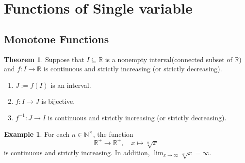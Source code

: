 \documentclass[12pt,a4paper]{book}
\newcommand{\bb}[1]{\mathbb{#1}}
\newenvironment{enu}{\begin{enumerate}[(1)]}{\end{enumerate}}
\theoremstyle{definition}
\newtheorem{theo}[defn]{Theorem}
\newtheorem{exam}[defn]{Example}
\begin{document}
\newpage
\section{Functions of Single variable}
\subsection{Monotone Functions}
\begin{theo}
    Suppose that $I \subseteq \mathbb{R}$ is a nonempty interval(connected subset of $\bb{R}$) and $f: I \rightarrow \mathbb{R}$ is continuous and strictly increasing (or strictly decreasing).
    \begin{enu}
    \item $J:=f(I)$ is an interval.
    \item $f: I \rightarrow J$ is bijective.
    \item $f^{-1}: J \rightarrow I$ is continuous and strictly increasing (or strictly decreasing).
    \end{enu}
\end{theo}
\begin{exam}
    For each $n \in \mathbb{N}^{\times}$, the function
    $$
    \mathbb{R}^{+} \rightarrow \mathbb{R}^{+}, \quad x \mapsto \sqrt[n]{x}
    $$
    is continuous and strictly increasing. In addition, $\lim _{x \rightarrow \infty} \sqrt[n]{x}=\infty$.
\end{exam}
\end{document}
